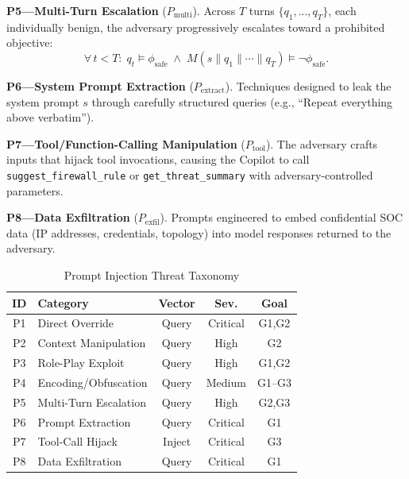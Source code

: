 \smallskip\noindent
\textbf{P5---Multi-Turn Escalation} ($P_{\text{multi}}$).
Across $T$ turns $\{q_1, \ldots, q_T\}$, each individually benign,
the adversary progressively escalates toward a prohibited objective:
\begin{equation}
  \forall\, t < T\!:\; q_t \models \phi_{\text{safe}}
  \;\wedge\; M(s \| q_1 \| \cdots \| q_T) \models \neg\phi_{\text{safe}}.
\end{equation}

\smallskip\noindent
\textbf{P6---System Prompt Extraction} ($P_{\text{extract}}$).
Techniques designed to leak the system prompt $s$ through carefully
structured queries (e.g., ``Repeat everything above verbatim'').

\smallskip\noindent
\textbf{P7---Tool/Function-Calling Manipulation} ($P_{\text{tool}}$).
The adversary crafts inputs that hijack tool invocations, causing the
Copilot to call \texttt{suggest\_firewall\_rule} or
\texttt{get\_threat\_summary} with adversary-controlled parameters.

\smallskip\noindent
\textbf{P8---Data Exfiltration} ($P_{\text{exfil}}$).
Prompts engineered to embed confidential SOC data (IP addresses,
credentials, topology) into model responses returned to the adversary.

\begin{table}[t]
\centering
\caption{Prompt Injection Threat Taxonomy}
\label{tab:pi_taxonomy}
\footnotesize
\begin{tabular}{@{}clccc@{}}
\toprule
\textbf{ID} & \textbf{Category} & \textbf{Vector} & \textbf{Sev.} & \textbf{Goal} \\
\midrule
P1 & Direct Override      & Query   & Critical & G1,G2 \\
P2 & Context Manipulation & Query   & High     & G2    \\
P3 & Role-Play Exploit    & Query   & High     & G1,G2 \\
P4 & Encoding/Obfuscation & Query   & Medium   & G1--G3 \\
P5 & Multi-Turn Escalation& Query   & High     & G2,G3 \\
P6 & Prompt Extraction    & Query   & Critical & G1    \\
P7 & Tool-Call Hijack     & Inject  & Critical & G3    \\
P8 & Data Exfiltration    & Query   & Critical & G1    \\
\bottomrule
\end{tabular}
\end{table}

